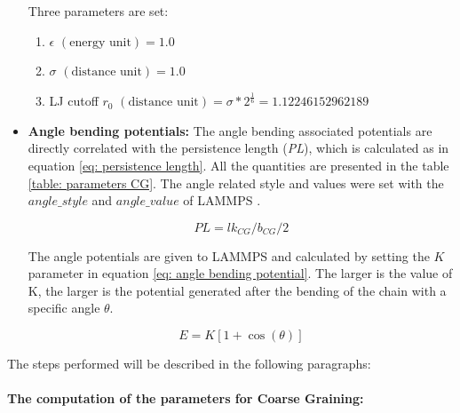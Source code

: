 \begin{itemize}
    Three parameters are set:

    \begin{enumerate} %
        \item $\epsilon$ $(\text{energy unit}) = 1.0$
        \item $\sigma$ $(\text{distance unit}) = 1.0$
        \item LJ cutoff $r_0$ $(\text{distance unit}) = \sigma * 2^{\frac{1}{6}} = 1.12246152962189$
    \end{enumerate}

    \item \textbf{Angle bending potentials: }The angle bending associated potentials are directly correlated with the persistence length (\textit{PL}), which is calculated as in equation \ref{eq: persistence length}. All the quantities are presented in the table \ref{table: parameters CG}. 
    The angle related style and values were set with the $angle\_style$ and $angle\_value$ of LAMMPS
    \cite{thompsonLAMMPSFlexibleSimulation2022}.


    \begin{equation} \label{eq: persistence length}
        PL = lk_{CG} / b_{CG} / 2
    \end{equation}

    The angle potentials are given to LAMMPS and calculated by setting the $K$ parameter in equation \ref{eq: angle bending potential}. The larger is the value of K, the larger is the potential generated after the bending of the chain with a specific angle $\theta$.

    \begin{equation} \label{eq: angle bending potential}
        E = K[1 + \cos{(\theta)}]    
    \end{equation}

\end{itemize}

The steps performed will be described in the following paragraphs:


\paragraph{The computation of the parameters for Coarse Graining:}

